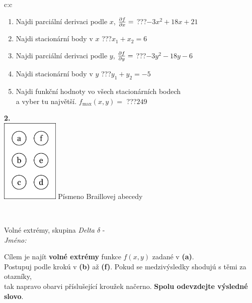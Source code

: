 \documentclass[10pt]{report}
\begin{document}
\begin{tabular}{c:c}
\begin{minipage}[c][104.5mm][t]{0.5\linewidth}
\begin{center}
\begin{minipage}{0.79\linewidth}
\begin{center}
\begin{varwidth}{\linewidth}
\begin{enumerate}
\item Najdi parciální derivaci podle $x$, $\pdv{f}{x}=$\quad \dotfill\; ???\;\dotfill \quad $-3x^2+18x+21$
\item Najdi stacionární body v $x$\quad \dotfill\; ???\;\dotfill \quad $x_1+x_2=6$
\item Najdi parciální derivaci podle $y$, $\pdv{f}{y}=$\quad \dotfill\; ???\;\dotfill \quad $-3y^2-18y-6$
\item Najdi stacionární body v $y$\quad \dotfill\; ???\;\dotfill \quad $y_1+y_2=-5$
\item Najdi funkční hodnoty vo všech stacionárních bodech \\ \phantom{xxxxxx} a vyber tu najvětší. $f_{\text{max}}(x,y)=$\quad \dotfill\; ???\;\dotfill \quad $249$
\end{enumerate}
\end{varwidth}
\end{center}
\end{minipage}
\begin{minipage}{0.20\linewidth}
\begin{center}
{\Huge\bfseries 2.} \\[2mm]
\includegraphics[height=40mm]{../images/braille.png}
{\small Písmeno Braillovej abecedy}
\end{center}
\end{minipage}
\end{center}
\end{minipage}
\\ \hdashline
\begin{minipage}[c][104.5mm][t]{0.5\linewidth}
\begin{center}
\vspace{7mm}
{\huge Volné extrémy, skupina \textit{Delta $\delta$} -}\\[5mm]
\textit{Jméno:}\phantom{xxxxxxxxxxxxxxxxxxxxxxxxxxxxxxxxxxxxxxxxxxxxxxxxxxxxxxxxxxxxxxxxx}\\[5mm]
\begin{minipage}{0.95\linewidth}
\begin{center}
Cílem je najít \textbf{volné extrémy} funkce $f(x,y)$ zadané v \textbf{(a)}.\\Postupuj podle krokú v \textbf{(b)} až \textbf{(f)}. Pokud se medzivýsledky shodujú s těmi za otazníky,\\tak napravo obarvi příslušející kroužek načerno. \textbf{Spolu odevzdejte výsledné slovo}.

\end{center}
\end{minipage}
\end{center}
\end{minipage}
\end{tabular}
\end{document}
